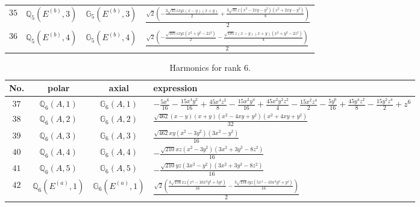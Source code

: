 \documentclass[fleqn,8pt,landscape]{jsarticle}
\begin{document}
\begin{table}[ht!]
\begin{center}
\begin{tabular}{cccl}
$ 35 $ & $ \mathbb{Q}_{5}(E^{(b)},3) $ & $ \mathbb{G}_{5}(E^{(b)},3) $ & $ \frac{\sqrt{2} \left(- \frac{3 \sqrt{35} i x y z \left(x - y\right) \left(x + y\right)}{2} + \frac{3 \sqrt{35} z \left(x^{2} - 2 x y - y^{2}\right) \left(x^{2} + 2 x y - y^{2}\right)}{8}\right)}{2} $ \\
$ 36 $ & $ \mathbb{Q}_{5}(E^{(b)},4) $ & $ \mathbb{G}_{5}(E^{(b)},4) $ & $ \frac{\sqrt{2} \left(- \frac{\sqrt{105} i x y z \left(x^{2} + y^{2} - 2 z^{2}\right)}{2} - \frac{\sqrt{105} z \left(x - y\right) \left(x + y\right) \left(x^{2} + y^{2} - 2 z^{2}\right)}{4}\right)}{2} $ \\
 \hline \hline
\end{tabular}
\end{center}
\end{table}
\begin{table}[ht!]
\begin{center}
\caption{Harmonics for rank 6.}
\renewcommand{\arraystretch}{1.3}
\begin{tabular}{cccl} \hline \hline
No. & polar & axial & expression \\ \hline
$ 37 $ & $ \mathbb{Q}_{6}(A,1) $ & $ \mathbb{G}_{6}(A,1) $ & $ - \frac{5 x^{6}}{16} - \frac{15 x^{4} y^{2}}{16} + \frac{45 x^{4} z^{2}}{8} - \frac{15 x^{2} y^{4}}{16} + \frac{45 x^{2} y^{2} z^{2}}{4} - \frac{15 x^{2} z^{4}}{2} - \frac{5 y^{6}}{16} + \frac{45 y^{4} z^{2}}{8} - \frac{15 y^{2} z^{4}}{2} + z^{6} $ \\
$ 38 $ & $ \mathbb{Q}_{6}(A,2) $ & $ \mathbb{G}_{6}(A,2) $ & $ \frac{\sqrt{462} \left(x - y\right) \left(x + y\right) \left(x^{2} - 4 x y + y^{2}\right) \left(x^{2} + 4 x y + y^{2}\right)}{32} $ \\
$ 39 $ & $ \mathbb{Q}_{6}(A,3) $ & $ \mathbb{G}_{6}(A,3) $ & $ \frac{\sqrt{462} x y \left(x^{2} - 3 y^{2}\right) \left(3 x^{2} - y^{2}\right)}{16} $ \\
$ 40 $ & $ \mathbb{Q}_{6}(A,4) $ & $ \mathbb{G}_{6}(A,4) $ & $ - \frac{\sqrt{210} x z \left(x^{2} - 3 y^{2}\right) \left(3 x^{2} + 3 y^{2} - 8 z^{2}\right)}{16} $ \\
$ 41 $ & $ \mathbb{Q}_{6}(A,5) $ & $ \mathbb{G}_{6}(A,5) $ & $ - \frac{\sqrt{210} y z \left(3 x^{2} - y^{2}\right) \left(3 x^{2} + 3 y^{2} - 8 z^{2}\right)}{16} $ \\
$ 42 $ & $ \mathbb{Q}_{6}(E^{(a)},1) $ & $ \mathbb{G}_{6}(E^{(a)},1) $ & $ \frac{\sqrt{2} \left(\frac{3 \sqrt{154} x z \left(x^{4} - 10 x^{2} y^{2} + 5 y^{4}\right)}{16} - \frac{3 \sqrt{154} i y z \left(5 x^{4} - 10 x^{2} y^{2} + y^{4}\right)}{16}\right)}{2} $ \\

\end{tabular}
\end{center}
\end{table}
\end{document}
